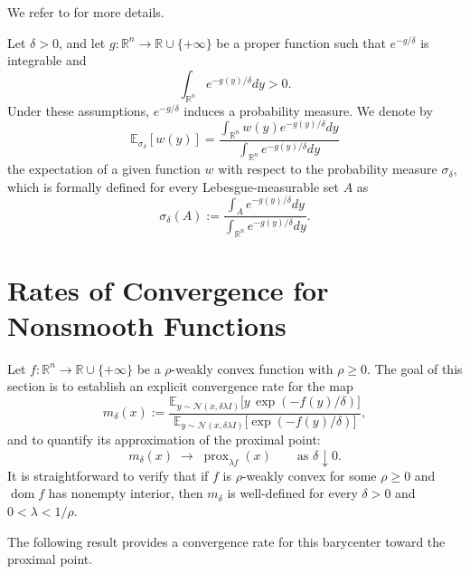 \documentclass[11pt]{amsart}
\newcommand{\1}{\mathds{1}}
\theoremstyle{definition}
\theoremstyle{remark}
\theoremstyle{definition}
\begin{document}
We refer to \cite{MR3288271,MR3616647} for more details.


Let $\delta>0$, and let $g\colon \mathbb{R}^n \to \mathbb{R}\cup \{+\infty\}$ be a proper function such that $e^{-g/\delta}$ is integrable and
$$
\int_{\mathbb{R}^n}e^{-g(y)/\delta}dy>0.
$$
Under these assumptions, $e^{-g/\delta}$ induces a probability measure. We denote by
$$
\mathbb{E}_{\sigma_{\delta}}[w(y)]=\frac{\int_{\mathbb{R}^n} w(y)e^{-g(y)/\delta}dy}{\int_{\mathbb{R}^n}e^{-g(y)/\delta}dy}
$$
the expectation of a given function $w$ with respect to the probability measure $\sigma_\delta$, which is formally defined for every Lebesgue-measurable set $A$ as
$$ \sigma_\delta (A) := \frac{\int_{A} e^{-g(y)/\delta}dy}{\int_{\mathbb{R}^n}e^{-g(y)/\delta}dy}.  $$

\section{Rates of Convergence for Nonsmooth Functions}\label{Section3}
Let \(f:\mathbb{R}^n\to \mathbb{R}\cup\{+\infty\}\) be a \(\rho\)-weakly convex function with \(\rho\ge 0\). 
The goal of this section is to establish an explicit convergence rate for the map
\[
m_{\delta}(x)
:=\frac{\mathbb{E}_{y\sim \mathcal{N}(x,\delta \lambda I)}\!\bigl[y\, \exp(-f(y)/\delta)\bigr]}
{\mathbb{E}_{y\sim \mathcal{N}(x,\delta \lambda I)}\!\bigl[\exp(-f(y)/\delta)\bigr]},
\]
and to quantify its approximation of the proximal point:
\[
m_{\delta}(x)\;\longrightarrow\;\operatorname{prox}_{\lambda f}(x)\qquad \text{as }\delta\downarrow 0.
\]
It is straightforward to verify that if $f$ is $\rho$-weakly convex for some $\rho\ge 0$ and $\operatorname{dom} f$ has nonempty interior, then $m_\delta$ is well-defined for every $\delta>0$ and $0<\lambda <1/\rho$. 


The following result provides a convergence rate for this barycenter toward the proximal point.
\end{document}
